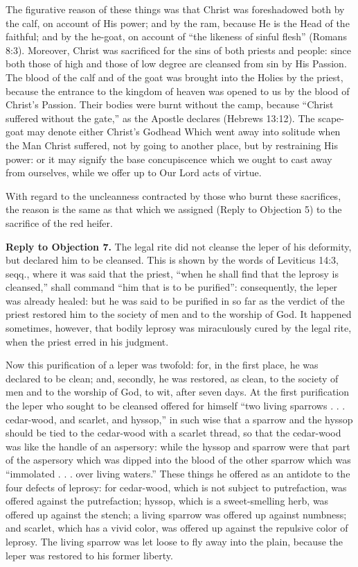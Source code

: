The figurative reason of these things was that Christ was foreshadowed both by the calf, on account of His power; and by the ram, because He is the Head of the faithful; and by the he-goat, on account of ``the likeness of sinful flesh'' (Romans 8:3). Moreover, Christ was sacrificed for the sins of both priests and people: since both those of high and those of low degree are cleansed from sin by His Passion. The blood of the calf and of the goat was brought into the Holies by the priest, because the entrance to the kingdom of heaven was opened to us by the blood of Christ's Passion. Their bodies were burnt without the camp, because ``Christ suffered without the gate,'' as the Apostle declares (Hebrews 13:12). The scape-goat may denote either Christ's Godhead Which went away into solitude when the Man Christ suffered, not by going to another place, but by restraining His power: or it may signify the base concupiscence which we ought to cast away from ourselves, while we offer up to Our Lord acts of virtue.

With regard to the uncleanness contracted by those who burnt these sacrifices, the reason is the same as that which we assigned (Reply to Objection 5) to the sacrifice of the red heifer.

\textbf{Reply to Objection 7.} The legal rite did not cleanse the leper of his deformity, but declared him to be cleansed. This is shown by the words of Leviticus 14:3, seqq., where it was said that the priest, ``when he shall find that the leprosy is cleansed,'' shall command ``him that is to be purified'': consequently, the leper was already healed: but he was said to be purified in so far as the verdict of the priest restored him to the society of men and to the worship of God. It happened sometimes, however, that bodily leprosy was miraculously cured by the legal rite, when the priest erred in his judgment.

Now this purification of a leper was twofold: for, in the first place, he was declared to be clean; and, secondly, he was restored, as clean, to the society of men and to the worship of God, to wit, after seven days. At the first purification the leper who sought to be cleansed offered for himself ``two living sparrows . . . cedar-wood, and scarlet, and hyssop,'' in such wise that a sparrow and the hyssop should be tied to the cedar-wood with a scarlet thread, so that the cedar-wood was like the handle of an aspersory: while the hyssop and sparrow were that part of the aspersory which was dipped into the blood of the other sparrow which was ``immolated . . . over living waters.'' These things he offered as an antidote to the four defects of leprosy: for cedar-wood, which is not subject to putrefaction, was offered against the putrefaction; hyssop, which is a sweet-smelling herb, was offered up against the stench; a living sparrow was offered up against numbness; and scarlet, which has a vivid color, was offered up against the repulsive color of leprosy. The living sparrow was let loose to fly away into the plain, because the leper was restored to his former liberty.


